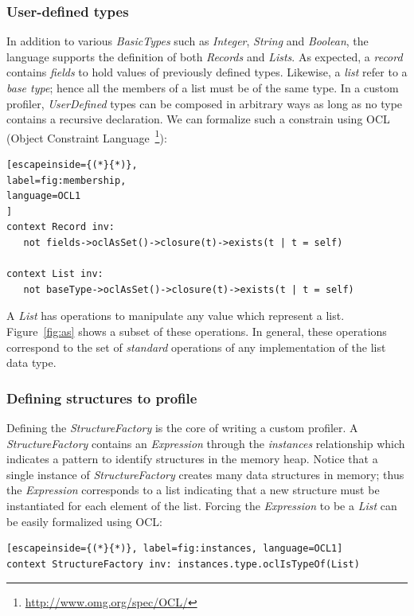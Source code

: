 \subsubsection{User-defined types}
In addition to various \textit{BasicTypes} such as \textit{Integer}, \textit{String} and \textit{Boolean}, the language supports the definition of both \textit{Records} and \textit{Lists}.
As expected, a \textit{record} contains \textit{fields} to hold values of previously defined types.
Likewise, a \textit{list} refer to a \textit{base type}; hence all the members of a list must be of the same type.
In a custom profiler, \textit{UserDefined} types can be composed in arbitrary ways as long as no type contains a recursive declaration.
We can formalize such a constrain using OCL (Object Constraint Language~\footnote{\url{http://www.omg.org/spec/OCL/}}):

\begin{lstlisting}[escapeinside={(*}{*)},
label=fig:membership,
language=OCL1
]
context Record inv: 
   not fields->oclAsSet()->closure(t)->exists(t | t = self)

context List inv:
   not baseType->oclAsSet()->closure(t)->exists(t | t = self)
\end{lstlisting} 

A \textit{List} has operations to manipulate any value which represent a list.
Figure~\ref{fig:as} shows a subset of these operations.
In general, these operations correspond to the set of \textit{standard} operations of any implementation of the list data type.

\subsubsection{Defining structures to profile}
Defining the \textit{StructureFactory} is the core of writing a custom profiler.
A \textit{StructureFactory} contains an \textit{Expression} through the \textit{instances} relationship which indicates a pattern to identify structures in the memory heap.
Notice that a single instance of \textit{StructureFactory} creates many data structures in memory; thus the \textit{Expression} corresponds to a list indicating that a new structure must be instantiated for each element of the list.
Forcing the \textit{Expression} to be a \textit{List} can be easily formalized using OCL:

\begin{lstlisting}[escapeinside={(*}{*)}, label=fig:instances, language=OCL1]
context StructureFactory inv: instances.type.oclIsTypeOf(List)
\end{lstlisting}

